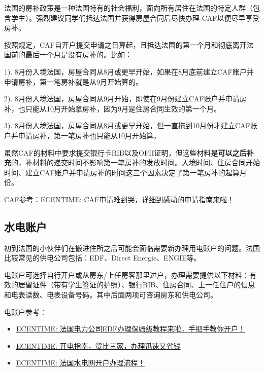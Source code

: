 \documentclass[UTF8]{ctexart}
\begin{document}
法国的房补政策是一种法国特有的社会福利，面向所有居住在法国的特定人群（包含学生）。强烈建议同学们抵达法国并获得房屋合同后尽快办理 CAF以便尽早享受房补。

按照规定，CAF自开户提交申请之日算起，且抵达法国的第一个月和彻底离开法国前的最后一个月是没有房补的。比如：

1). 8月份入境法国，房屋合同从8月或更早开始，如果在8月底前建立CAF账户并申请房补，第一笔房补就是从9月开始算的。 

2). 8月份入境法国，房屋合同从9月开始，即使在9月份建立CAF账户并申请房补，也只能从10月开始拿房补，因为9月是住房合同生效的第一个月。 

3). 8月份入境法国，房屋合同从8月或更早开始，但一直拖到10月份才建立CAF账户并申请房补，第一笔房补也只能从10月开始算。

虽然CAF的材料中要求提交银行卡RIB以及OFII证明，但这些材料是\textbf{可以之后补充}的，补材料的递交时间不影响第一笔房补的发放时间。入境时间、住房合同开始时间、建立CAF账户并申请房补的时间这三个因素决定了第一笔房补的起算月份。

CAF参考：\href{https://www.ecentime.com/article/demande-caf}{ECENTIME: CAF申请难到哭，详细到感动的申请指南来啦！}
 
\subsection{水电账户}

初到法国的小伙伴们在搬进住所之后可能会面临需要新办理用电账户的问题。法国比较常见的供电公司包括：EDF、Direct Energie、ENGIE等。

电账户可选择自行开户或从房东/上任房客那里过户，办理需要提供以下材料：有效的居留证件（带有学生签证的护照）、银行RIB、住房合同、上一任住户的信息和电表读数、电表设备号码。其中后面两项可咨询房东和供电公司。

电账户参考：
\begin{itemize}
    \item \href{https://www.ecentime.com/article/edf}{ECENTIME: 法国电力公司EDF办理保姆级教程来啦，手把手教你开户！}
    
    \item \href{https://www.ecentime.com/article/guide-electricite-comparaison-prix-bas}{ECENTIME: 开电指南，货比三家，办理迅速又省钱}
    
    \item \href{https://www.ecentime.com/article/edf-box-internet}{ECENTIME: 法国水电网开户办理流程！}
\end{itemize}
\end{document}
